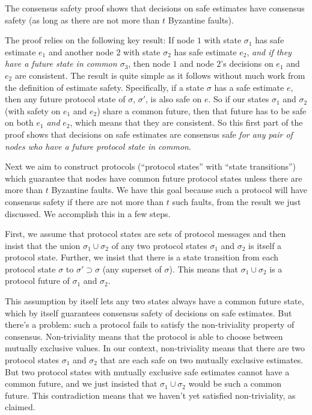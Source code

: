 \documentclass{article}
\theoremstyle{definition}
\begin{document}
The consensus safety proof shows that decisions on safe estimates have consensus safety (as long as there are not more than $t$ Byzantine faults). 

The proof relies on the following key result: If node $1$ with state $\sigma_1$ has safe estimate $e_1$ and another node $2$ with state $\sigma_2$ has safe estimate $e_2$, \emph{and if they have a future state in common $\sigma_3$}, then node $1$ and node $2$'s decisions on $e_1$ and $e_2$ are consistent. The result is quite simple as it follows without much work from the definition of estimate safety. Specifically, if a state $\sigma$ has a safe estimate $e$, then any future protocol state of $\sigma$, $\sigma'$, is also safe on $e$. So if our states $\sigma_1$ and $\sigma_2$ (with safety on $e_1$ and $e_2$) share a common future, then that future has to be safe on both $e_1$ \emph{and} $e_2$, which means that they are consistent. So this first part of the proof shows that decisions on safe estimates are consensus safe \emph{for any pair of nodes who have a future protocol state in common}.

Next we aim to construct protocols (``protocol states'' with ``state transitions'') which guarantee that nodes have common future protocol states unless there are more than $t$ Byzantine faults. We have this goal because such a protocol will have consensus safety if there are not more than $t$ such faults, from the result we just discussed. We accomplish this in a few steps.

First, we assume that protocol states are sets of protocol messages and then insist that the union $\sigma_1 \cup \sigma_2$ of any two protocol states $\sigma_1$ and $\sigma_2$ is itself a protocol state. Further, we insist that there is a state transition from each protocol state $\sigma$ to $\sigma' \supset \sigma$ (any superset of $\sigma$). This means that $\sigma_1 \cup \sigma_2$ is a protocol future of $\sigma_1$ and $\sigma_2$.

This assumption by itself lets any two states always have a common future state, which by itself guarantees consensus safety of decisions on safe estimates. But there's a problem: such a protocol fails to satisfy the non-triviality property of consensus. Non-triviality means that the protocol is able to choose between mutually exclusive values. In our context, non-triviality means that there are two protocol states $\sigma_1$ and $\sigma_2$ that are each safe on two mutually exclusive estimates. But two protocol states with mutually exclusive safe estimates cannot have a common future, and we just insisted that $\sigma_1 \cup \sigma_2$ would be such a common future. This contradiction means that we haven't yet satisfied non-triviality, as claimed.
\end{document}
